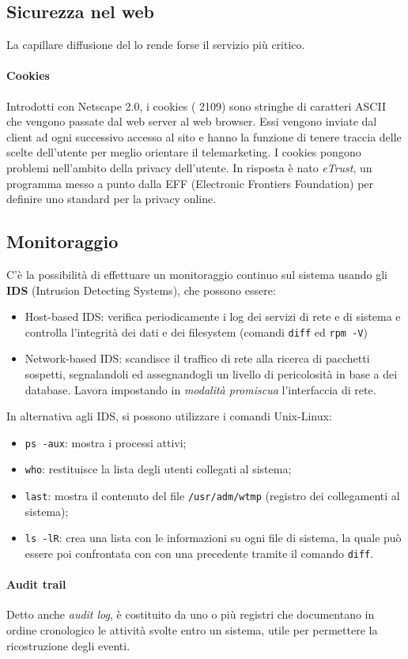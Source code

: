 \documentclass[a4paper, twoside]{article}
\def\code#1{\texttt{#1}}
\def\sub#1{\subsection{#1}\label{#1}}
\def\para#1{\paragraph{#1}\label{#1}}
\def\vedi#1{\nameref{#1}}
\begin{document}
\sub{Sicurezza nel web}
La capillare diffusione del \vedi{WWW} lo rende forse il servizio più critico. 
\para{Cookies} Introdotti con Netscape 2.0, i cookies (\vedi{RFC} 2109) sono stringhe di caratteri ASCII che vengono passate dal web server al web browser. Essi vengono inviate dal client ad ogni successivo accesso al sito e hanno la funzione di tenere traccia delle scelte dell'utente per meglio orientare il telemarketing. I cookies pongono problemi nell'ambito della privacy dell'utente. In risposta è nato \textit{eTrust}, un programma messo a punto dalla EFF (Electronic Frontiers Foundation) per definire uno standard per la privacy online.
\sub{Monitoraggio} C'è la possibilità di effettuare un monitoraggio continuo sul sistema usando gli \textbf{IDS} (Intrusion Detecting Systems), che possono essere:
\begin{itemize}
\item Host-based IDS: verifica periodicamente i log dei servizi di rete e di sistema e controlla l'integrità dei dati e dei filesystem (comandi \code{diff} ed \code{rpm -V})
\item Network-based IDS: scandisce il traffico di rete alla ricerca di pacchetti sospetti, segnalandoli ed assegnandogli un
livello di pericolosità in base a dei database. Lavora impostando in \textit{modalità promiscua} l'interfaccia di rete.
\end{itemize}
In alternativa agli IDS, si possono utilizzare i comandi Unix-Linux:
\begin{itemize}
\item \code{ps -aux}: mostra i processi attivi;
\item \code{who}: restituisce la lista degli utenti collegati al sistema;
\item \code{last}: mostra il contenuto del file \code{/usr/adm/wtmp} (registro dei collegamenti al sistema);
\item \code{ls -lR}: crea una lista con le informazioni su ogni file di sistema, la quale può essere poi confrontata con con una precedente tramite il comando \code{diff}.
\end{itemize}
\paragraph{Audit trail} 
Detto anche \textit{audit log}, è costituito da uno o più registri che documentano in ordine cronologico le attività svolte entro un sistema, utile per permettere la ricostruzione degli eventi.
\newpage
\end{document}
